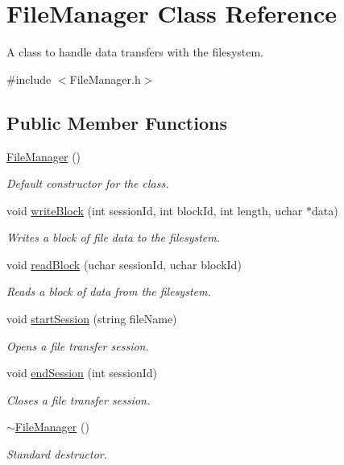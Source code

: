 \hypertarget{class_file_manager}{
\section{FileManager Class Reference}
\label{class_file_manager}
}


A class to handle data transfers with the filesystem.  




{\ttfamily \#include $<$FileManager.h$>$}

\subsection*{Public Member Functions}
\begin{DoxyCompactItemize}
\item 
\hyperlink{class_file_manager_a8afd512c06be9daf140cc19d71f9b391}{FileManager} ()
\begin{DoxyCompactList}\small\item\em Default constructor for the class. \item\end{DoxyCompactList}\item 
void \hyperlink{class_file_manager_a9b00c266d6a279a7fe9d1b18649d93c7}{writeBlock} (int sessionId, int blockId, int length, uchar $\ast$data)
\begin{DoxyCompactList}\small\item\em Writes a block of file data to the filesystem. \item\end{DoxyCompactList}\item 
void \hyperlink{class_file_manager_aa4e29db00b18f76e9077ccfae86ead2e}{readBlock} (uchar sessionId, uchar blockId)
\begin{DoxyCompactList}\small\item\em Reads a block of data from the filesystem. \item\end{DoxyCompactList}\item 
void \hyperlink{class_file_manager_ab6fdba3fb4643d07e387f67d46f264f2}{startSession} (string fileName)
\begin{DoxyCompactList}\small\item\em Opens a file transfer session. \item\end{DoxyCompactList}\item 
void \hyperlink{class_file_manager_a789e8afe9bb1d763e86e9bb97c48bff2}{endSession} (int sessionId)
\begin{DoxyCompactList}\small\item\em Closes a file transfer session. \item\end{DoxyCompactList}\item 
\hyperlink{class_file_manager_abaed33b5b0c13b8a597db9335a1aacfa}{$\sim$FileManager} ()
\begin{DoxyCompactList}\small\item\em Standard destructor. \item\end{DoxyCompactList}\end{DoxyCompactItemize}


